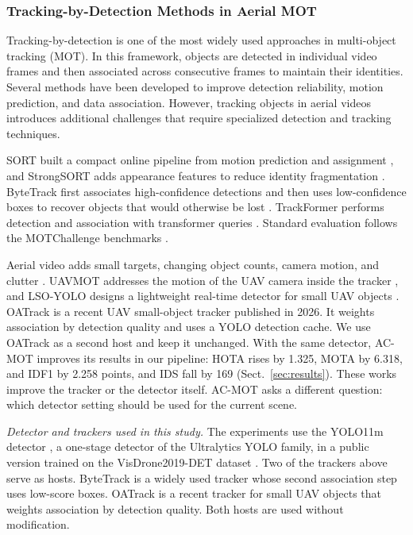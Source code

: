 \documentclass[pdflatex,sn-mathphys-num,iicol]{sn-jnl}
\begin{document}
\subsubsection{Tracking-by-Detection Methods in Aerial MOT}\label{sec:hosts}
Tracking-by-detection is one of the most widely used approaches in multi-object tracking (MOT). In this framework, objects are detected in individual video frames and then associated across consecutive frames to maintain their identities. Several methods have been developed to improve detection reliability, motion prediction, and data association. However, tracking objects in aerial videos introduces additional challenges that require specialized detection and tracking techniques.

SORT built a compact online pipeline from motion prediction and assignment
\cite{bewley2016sort}, and StrongSORT adds appearance features to reduce
identity fragmentation \cite{du2023strongsort}. ByteTrack first associates
high-confidence detections and then uses low-confidence boxes to recover
objects that would otherwise be lost \cite{zhang2022bytetrack}. TrackFormer
performs detection and association with transformer queries
\cite{meinhardt2022trackformer}. Standard evaluation follows the MOTChallenge
benchmarks \cite{dendorfer2021motchallenge}.

Aerial video adds small targets, changing object counts, camera motion, and
clutter \cite{zhu2022visdrone,du2018uavdt}. UAVMOT addresses the motion of the
UAV camera inside the tracker \cite{liu2022uavmot}, and LSO-YOLO designs a
lightweight real-time detector for small UAV objects \cite{dai2026lsoyolo}.
OATrack \cite{qi2026oatrack} is a recent UAV small-object tracker published in
2026. It weights association by detection quality and uses a YOLO detection
cache. We use OATrack as a second host and keep it unchanged. With the same
detector, AC-MOT improves its results in our pipeline: HOTA rises by 1.325,
MOTA by 6.318, and IDF1 by 2.258 points, and IDS fall by 169
(Sect.~\ref{sec:results}). These works improve the tracker or the detector
itself. AC-MOT asks a different question: which detector setting should be
used for the current scene.

\emph{Detector and trackers used in this study.} The experiments use the YOLO11m detector \cite{jocher2024yolo11}, a
one-stage detector of the Ultralytics YOLO family, in a public version trained
on the VisDrone2019-DET dataset \cite{zhu2022visdrone}. Two of the trackers
above serve as hosts. ByteTrack \cite{zhang2022bytetrack} is a widely used
tracker whose second association step uses low-score boxes. OATrack
\cite{qi2026oatrack} is a recent tracker for small UAV objects that weights
association by detection quality. Both hosts are used without modification.
\end{document}
